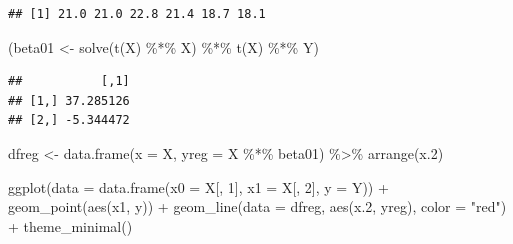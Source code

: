 \documentclass[
  12pt,
]{book}
\newenvironment{Shaded}{\begin{snugshade}}{\end{snugshade}}
\newcommand{\AttributeTok}[1]{\textcolor[rgb]{0.77,0.63,0.00}{#1}}
\newcommand{\DecValTok}[1]{\textcolor[rgb]{0.00,0.00,0.81}{#1}}
\newcommand{\FloatTok}[1]{\textcolor[rgb]{0.00,0.00,0.81}{#1}}
\newcommand{\FunctionTok}[1]{\textcolor[rgb]{0.00,0.00,0.00}{#1}}
\newcommand{\NormalTok}[1]{#1}
\newcommand{\OtherTok}[1]{\textcolor[rgb]{0.56,0.35,0.01}{#1}}
\newcommand{\SpecialCharTok}[1]{\textcolor[rgb]{0.00,0.00,0.00}{#1}}
\newcommand{\StringTok}[1]{\textcolor[rgb]{0.31,0.60,0.02}{#1}}
\begin{document}
\begin{Shaded}
\end{Shaded}

\begin{verbatim}
## [1] 21.0 21.0 22.8 21.4 18.7 18.1
\end{verbatim}

\begin{Shaded}
\begin{Highlighting}[]
\NormalTok{(beta01 }\OtherTok{\textless{}{-}} \FunctionTok{solve}\NormalTok{(}\FunctionTok{t}\NormalTok{(X) }\SpecialCharTok{\%*\%}\NormalTok{ X) }\SpecialCharTok{\%*\%} \FunctionTok{t}\NormalTok{(X) }\SpecialCharTok{\%*\%}\NormalTok{ Y)}
\end{Highlighting}
\end{Shaded}

\begin{verbatim}
##           [,1]
## [1,] 37.285126
## [2,] -5.344472
\end{verbatim}

\begin{Shaded}
\begin{Highlighting}[]
\NormalTok{dfreg }\OtherTok{\textless{}{-}} \FunctionTok{data.frame}\NormalTok{(}\AttributeTok{x =}\NormalTok{ X, }\AttributeTok{yreg =}\NormalTok{ X }\SpecialCharTok{\%*\%}\NormalTok{ beta01) }\SpecialCharTok{\%\textgreater{}\%}
    \FunctionTok{arrange}\NormalTok{(x}\FloatTok{.2}\NormalTok{)}
\end{Highlighting}
\end{Shaded}

\begin{Shaded}
\begin{Highlighting}[]
\FunctionTok{ggplot}\NormalTok{(}\AttributeTok{data =} \FunctionTok{data.frame}\NormalTok{(}\AttributeTok{x0 =}\NormalTok{ X[, }\DecValTok{1}\NormalTok{], }\AttributeTok{x1 =}\NormalTok{ X[, }\DecValTok{2}\NormalTok{],}
    \AttributeTok{y =}\NormalTok{ Y)) }\SpecialCharTok{+} \FunctionTok{geom\_point}\NormalTok{(}\FunctionTok{aes}\NormalTok{(x1, y)) }\SpecialCharTok{+} \FunctionTok{geom\_line}\NormalTok{(}\AttributeTok{data =}\NormalTok{ dfreg,}
    \FunctionTok{aes}\NormalTok{(x}\FloatTok{.2}\NormalTok{, yreg), }\AttributeTok{color =} \StringTok{"red"}\NormalTok{) }\SpecialCharTok{+} \FunctionTok{theme\_minimal}\NormalTok{()}
\end{Highlighting}
\end{Shaded}
\end{document}
